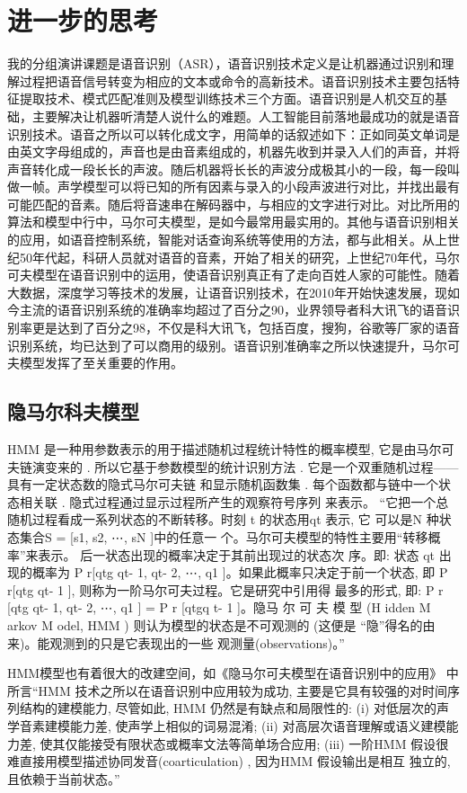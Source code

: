 \documentclass{article}
\begin{document}
\section{进一步的思考}
我的分组演讲课题是语音识别（ASR），语音识别技术定义是让机器通过识别和理解过程把语音信号转变为相应的文本或命令的高新技术。语音识别技术主要包括特征提取技术、模式匹配准则及模型训练技术三个方面。语音识别是人机交互的基础，主要解决让机器听清楚人说什么的难题。人工智能目前落地最成功的就是语音识别技术。语音之所以可以转化成文字，用简单的话叙述如下：正如同英文单词是由英文字母组成的，声音也是由音素组成的，机器先收到并录入人们的声音，并将声音转化成一段长长的声波。随后机器将长长的声波分成极其小的一段，每一段叫做一帧。声学模型可以将已知的所有因素与录入的小段声波进行对比，并找出最有可能匹配的音素。随后将音速串在解码器中，与相应的文字进行对比。对比所用的算法和模型中行中，马尔可夫模型，是如今最常用最实用的。其他与语音识别相关的应用，如语音控制系统，智能对话查询系统等使用的方法，都与此相关。从上世纪50年代起，科研人员就对语音的音素，开始了相关的研究，上世纪70年代，马尔可夫模型在语音识别中的运用，使语音识别真正有了走向百姓人家的可能性。随着大数据，深度学习等技术的发展，让语音识别技术，在2010年开始快速发展，现如今主流的语音识别系统的准确率均超过了百分之90，业界领导者科大讯飞的语音识别率更是达到了百分之98，不仅是科大讯飞，包括百度，搜狗，谷歌等厂家的语音识别系统，均已达到了可以商用的级别。语音识别准确率之所以快速提升，马尔可夫模型发挥了至关重要的作用。\par
\subsection{隐马尔科夫模型}
HMM 是一种用参数表示的用于描述随机过程统计特性的概率模型, 它是由马尔可夫链演变来的 . 所以它基于参数模型的统计识别方法 . 它是一个双重随机过程——具有一定状态数的隐式马尔可夫链 和显示随机函数集 . 每个函数都与链中一个状态相关联 . 隐式过程通过显示过程所产生的观察符号序列 来表示。  “它把一个总随机过程看成一系列状态的不断转移。时刻 t 的状态用qt 表示, 它 可以是N 种状态集合S = [s1, s2, ⋯, sN ]中的任意一 个。马尔可夫模型的特性主要用“转移概率”来表示。 后一状态出现的概率决定于其前出现过的状态次 序。即: 状态 qt 出现的概率为 P r[qtg qt- 1, qt- 2, ⋯, q1 ]。如果此概率只决定于前一个状态, 即 P r[qtg qt- 1 ], 则称为一阶马尔可夫过程。它是研究中引用得 最多的形式, 即: P r [qtg qt- 1, qt- 2, ⋯, q1 ] = P r [qtgq t- 1 ]。隐马 尔 可 夫 模 型 (H idden M arkov M odel, HMM ) 则认为模型的状态是不可观测的 (这便是 “隐”得名的由来)。能观测到的只是它表现出的一些 观测量(observations)。”\citep{yi}\par
HMM模型也有着很大的改建空间，如《隐马尔可夫模型在语音识别中的应用》 中所言“HMM 技术之所以在语音识别中应用较为成功, 主要是它具有较强的对时间序列结构的建模能力, 尽管如此, HMM 仍然是有缺点和局限性的: (i) 对低层次的声学音素建模能力差, 使声学上相似的词易混淆; (ii) 对高层次语音理解或语义建模能力差, 使其仅能接受有限状态或概率文法等简单场合应用; (iii) 一阶HMM 假设很难直接用模型描述协同发音(coarticulation) , 因为HMM 假设输出是相互 独立的, 且依赖于当前状态。”
\end{document}
